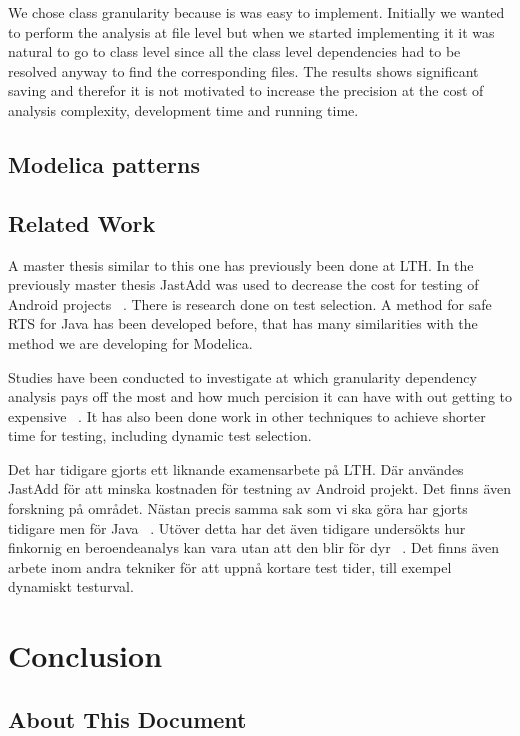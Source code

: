 \documentclass{cslthse-msc}
\begin{document}
We chose class granularity because is was easy to implement. Initially we wanted to perform the analysis at file level but when we started implementing it it was natural to go to class level since all the class level dependencies had to be resolved anyway to find the corresponding files. The results shows significant saving and therefor it is not motivated to increase the precision at the cost of analysis complexity, development time and running time.

\section{Modelica patterns}


\section{Related Work}

A master thesis similar to this one has previously been done at LTH. In the previously master thesis JastAdd was used to decrease the cost for testing of Android projects ~\cite{kampe2012dependroid}. There is research done on test selection. A method for safe RTS for Java has been developed before, that has many similarities with the method we are developing for Modelica. 

Studies have been conducted to investigate at which granularity dependency analysis pays off the most and how much percision it can have with out getting to expensive ~\cite{DBLP:conf/sigsoft/LegunsenHSLZM16}. It has also been done work in other techniques to achieve shorter time for testing, including dynamic test selection.

Det har tidigare gjorts ett liknande examensarbete på LTH. Där användes JastAdd för att minska kostnaden för testning av Android projekt. Det finns även forskning på området. Nästan precis samma sak som vi ska göra har gjorts tidigare men för Java ~\cite{DBLP:conf/pppj/OqvistHM16}. Utöver detta har det även tidigare undersökts hur finkornig en beroendeanalys kan vara utan att den blir för dyr ~\cite{DBLP:conf/sigsoft/LegunsenHSLZM16}. Det finns även arbete inom andra tekniker för att uppnå kortare test tider, till exempel dynamiskt testurval.
\chapter[Conclusion]{Conclusion}

\begin{appendices}
\chapter{About This Document}
\end{appendices}
\end{document}
